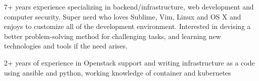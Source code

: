 

\begin{cvparagraph}

7+ years experience specializing in backend/infrastructure,
web development and computer security. Super nerd who loves Sublime, Vim,
Linux and OS X and enjoys to customize all of the development environment.
Interested in devising a better problem-solving method for challenging tasks,
and learning new technologies and tools if the need arises.

2+ years of experience in Openstack support and writing infrastructure as a code
using ansible and python, working knowledge of container and kubernetes
\end{cvparagraph}


